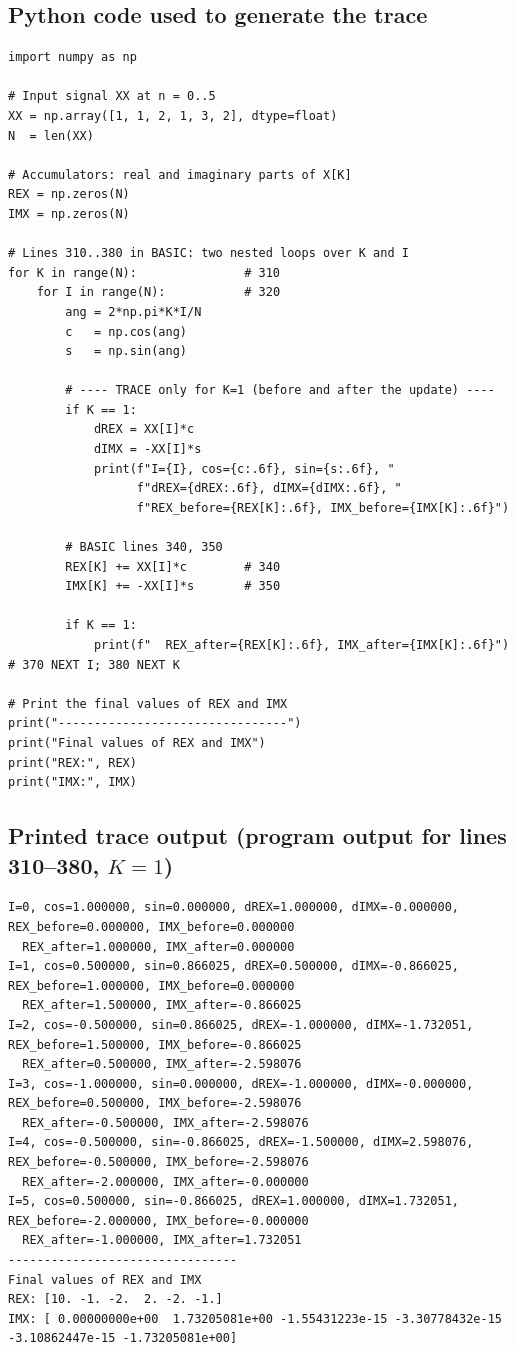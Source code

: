 \documentclass[a4paper,12pt]{article}
\begin{document}
\subsection*{Python code used to generate the trace}
\begin{verbatim}
import numpy as np

# Input signal XX at n = 0..5
XX = np.array([1, 1, 2, 1, 3, 2], dtype=float)
N  = len(XX)

# Accumulators: real and imaginary parts of X[K]
REX = np.zeros(N)
IMX = np.zeros(N)

# Lines 310..380 in BASIC: two nested loops over K and I
for K in range(N):               # 310
    for I in range(N):           # 320
        ang = 2*np.pi*K*I/N
        c   = np.cos(ang)
        s   = np.sin(ang)

        # ---- TRACE only for K=1 (before and after the update) ----
        if K == 1:
            dREX = XX[I]*c
            dIMX = -XX[I]*s
            print(f"I={I}, cos={c:.6f}, sin={s:.6f}, "
                  f"dREX={dREX:.6f}, dIMX={dIMX:.6f}, "
                  f"REX_before={REX[K]:.6f}, IMX_before={IMX[K]:.6f}")

        # BASIC lines 340, 350
        REX[K] += XX[I]*c        # 340
        IMX[K] += -XX[I]*s       # 350

        if K == 1:
            print(f"  REX_after={REX[K]:.6f}, IMX_after={IMX[K]:.6f}")
# 370 NEXT I; 380 NEXT K

# Print the final values of REX and IMX
print("--------------------------------")
print("Final values of REX and IMX")
print("REX:", REX)
print("IMX:", IMX)
\end{verbatim}

\subsection*{Printed trace output (program output for lines 310--380, $K=1$)}
\begin{verbatim}
I=0, cos=1.000000, sin=0.000000, dREX=1.000000, dIMX=-0.000000, REX_before=0.000000, IMX_before=0.000000
  REX_after=1.000000, IMX_after=0.000000
I=1, cos=0.500000, sin=0.866025, dREX=0.500000, dIMX=-0.866025, REX_before=1.000000, IMX_before=0.000000
  REX_after=1.500000, IMX_after=-0.866025
I=2, cos=-0.500000, sin=0.866025, dREX=-1.000000, dIMX=-1.732051, REX_before=1.500000, IMX_before=-0.866025
  REX_after=0.500000, IMX_after=-2.598076
I=3, cos=-1.000000, sin=0.000000, dREX=-1.000000, dIMX=-0.000000, REX_before=0.500000, IMX_before=-2.598076
  REX_after=-0.500000, IMX_after=-2.598076
I=4, cos=-0.500000, sin=-0.866025, dREX=-1.500000, dIMX=2.598076, REX_before=-0.500000, IMX_before=-2.598076
  REX_after=-2.000000, IMX_after=-0.000000
I=5, cos=0.500000, sin=-0.866025, dREX=1.000000, dIMX=1.732051, REX_before=-2.000000, IMX_before=-0.000000
  REX_after=-1.000000, IMX_after=1.732051
--------------------------------
Final values of REX and IMX
REX: [10. -1. -2.  2. -2. -1.]
IMX: [ 0.00000000e+00  1.73205081e+00 -1.55431223e-15 -3.30778432e-15
-3.10862447e-15 -1.73205081e+00]
\end{verbatim}
\end{document}
